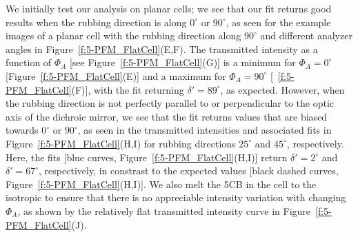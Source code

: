 We initially test our analysis on planar cells; we see that our fit returns good results when the rubbing direction is along $0^{\circ}$ or $90^{\circ}$, as seen for the example images of a planar cell with the rubbing direction along $90^{\circ}$ and different analyzer angles in Figure~\ref{f:5-PFM_FlatCell}(E,F).
The transmitted intensity as a function of $\Phi_A$ [see Figure~\ref{f:5-PFM_FlatCell}(G)] is a minimum for $\Phi_A = 0^{\circ}$ [Figure~\ref{f:5-PFM_FlatCell}(E)] and a maximum for $\Phi_A = 90^{\circ}$ [~\ref{f:5-PFM_FlatCell}(F)], with the fit returning $\delta' = 89^{\circ}$, as expected.
However, when the rubbing direction is not perfectly parallel to or perpendicular to the optic axis of the dichroic mirror, we see that the fit returns values that are biased towards $0^{\circ}$ or $90^{\circ}$, as seen in the transmitted intensities and associated fits in Figure~\ref{f:5-PFM_FlatCell}(H,I) for rubbing directions $25^{\circ}$ and $45^{\circ}$, respectively.
Here, the fits [blue curves, Figure~\ref{f:5-PFM_FlatCell}(H,I)] return $\delta' = 2^{\circ}$ and $\delta' = 67^{\circ}$, respectively, in constrast to the expected values [black dashed curves, Figure~\ref{f:5-PFM_FlatCell}(H,I)].
We also melt the 5CB in the cell to the isotropic to ensure that there is no appreciable intensity variation with changing $\Phi_A$, as shown by the relatively flat transmitted intensity curve in Figure~\ref{f:5-PFM_FlatCell}(J).



